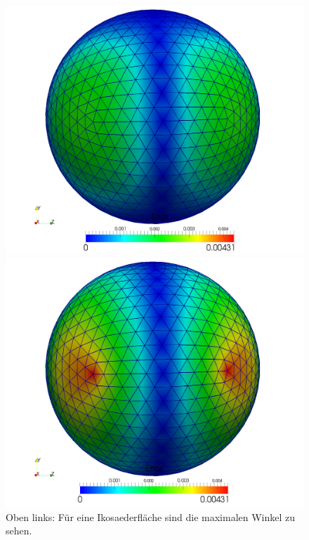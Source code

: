 \begin{figure}
      \begin{minipage}[t]{0.49\textwidth}
        \includegraphics[width=\textwidth]{bilder/laplaceSphere/DECError1k.png}
      \end{minipage}
      \hfill
      \begin{minipage}[t]{0.49\textwidth}
        \includegraphics[width=\textwidth]{bilder/laplaceSphere/FEMError1k.png}
      \end{minipage}
      \caption[Laplace auf Sphäre]{Oben links: Für eine Ikosaederfläche sind die maximalen Winkel zu sehen.
}
\end{figure}
